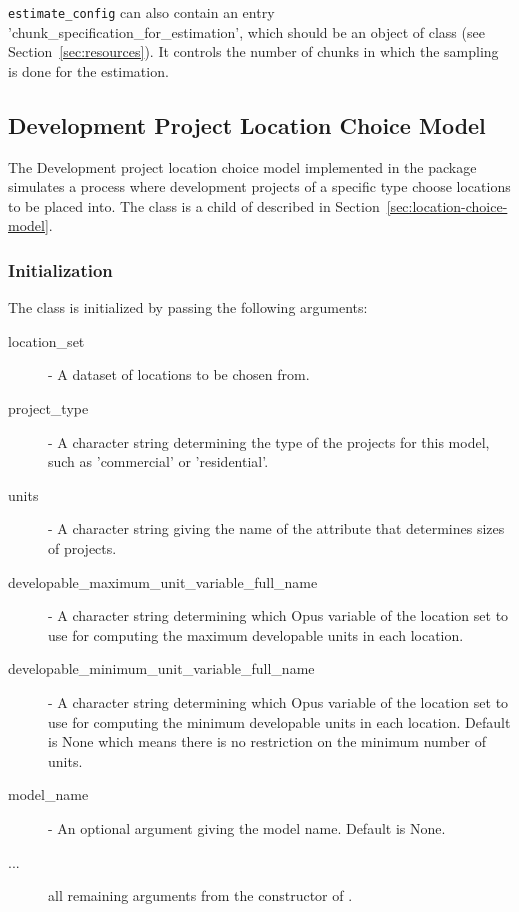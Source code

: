 \verb|estimate_config| can also contain an entry 'chunk_specification_for_estimation',
which should be an object of class  (see Section~\ref{sec:resources}).
It controls the number of chunks in which the sampling is done for the estimation.


\subsection{Development Project Location Choice Model}
\label{sec:development-project-lcm}
%
The Development project location choice model implemented in the
 package \modelsindex simulates a process where
development projects of a specific type choose locations to be placed into.
The class  \modelsindex is a child of
 \modelsindex described in
Section~\ref{sec:location-choice-model}.

\subsubsection{Initialization}
%
The class is initialized by passing the following arguments:
\begin{description}
\item[location_set] - A dataset \datasetindex of locations to be chosen from.
\item[project_type] - A character string determining the type of the projects
  for this model, such as 'commercial' or 'residential'. \modelsindex
\item[units] - A character string giving the name of the attribute \attributesindex that
  determines sizes of projects.
\item[developable_maximum_unit_variable_full_name] \variablesindex -  A character string determining
  which Opus variable \variablesindex of the location set to use for computing the maximum developable units
  in each location.
\item[developable_minimum_unit_variable_full_name] \variablesindex -  A character string determining
  which Opus variable \variablesindex of the location set to use for computing the minimum developable units
  in each location. Default is None which means there is no restriction on the minimum number of units.
\item[model_name] \modelsindex - An optional argument giving the model \modelsindex name. Default is None.
\item[...] all remaining arguments from the constructor of
  . \modelsindex
\end{description}

